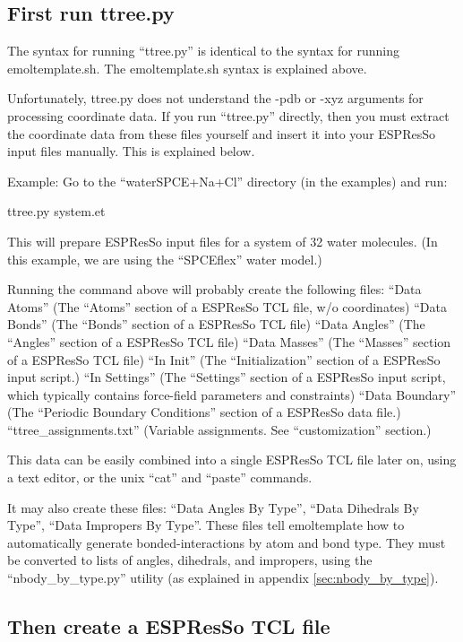 \documentclass[11pt]{article}
\begin{document}
\subsection{First run ttree.py}

The syntax for running ``ttree.py'' is identical to the syntax for running
emoltemplate.sh.  The emoltemplate.sh syntax is explained above.

Unfortunately, ttree.py does not understand the -pdb or -xyz arguments
for processing coordinate data.  If you run ``ttree.py'' directly, then you
must extract the coordinate  data from these files yourself and insert it into 
your ESPResSo input files manually.  This is explained below.

Example:
Go to the ``waterSPCE+Na+Cl'' directory (in the examples) and run:

ttree.py system.et

This will prepare ESPResSo input files for a system of 32 water molecules.
(In this example, we are using the ``SPCEflex'' water model.)

Running the command above will probably create the following files:
``Data Atoms''  (The ``Atoms'' section of a ESPResSo TCL file, w/o coordinates)
``Data Bonds''  (The ``Bonds'' section of a ESPResSo TCL file)
``Data Angles'' (The ``Angles'' section of a ESPResSo TCL file)
``Data Masses'' (The ``Masses'' section of a ESPResSo TCL file)
``In Init''   (The ``Initialization'' section of a ESPResSo input script.)
``In Settings'' (The ``Settings'' section of a ESPResSo input script, which typically
            contains force-field parameters and constraints)
``Data Boundary''    (The ``Periodic Boundary Conditions'' section of a ESPResSo data file.)
``ttree\_assignments.txt'' (Variable assignments. See ``customization'' section.)


This data can be easily combined into a single ESPResSo TCL file later on, 
using a text editor, or the unix
``cat'' and ``paste'' commands.

It may also create these files:
``Data Angles By Type'',
``Data Dihedrals By Type'',
``Data Impropers By Type''.
These files tell emoltemplate how to automatically generate bonded-interactions
by atom and bond type.  They must be converted to lists of 
angles, dihedrals, and impropers, using the ``nbody\_by\_type.py'' utility
(as explained in appendix \ref{sec:nbody_by_type}).


\subsection{Then create a ESPResSo TCL file}
\end{document}
